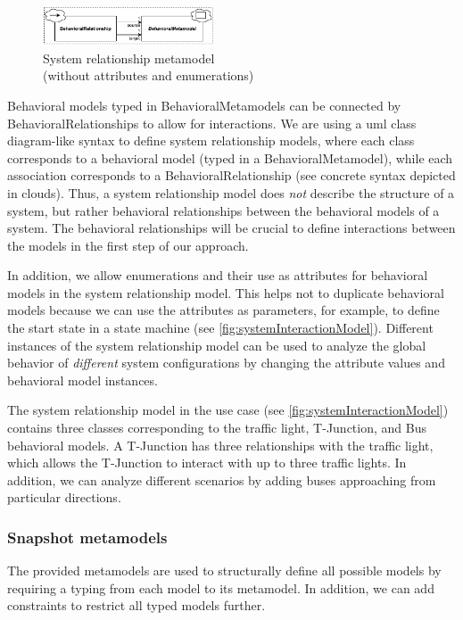 \documentclass{jot}
\begin{document}
\begin{figure}[h]
    \centering
    \includegraphics[width=0.45\textwidth]{figures/systemRelationshipMetamodel.pdf}
    \caption{System relationship metamodel \\ (without attributes and enumerations)}
    \label{fig:systemRelationshipMetamodel}
\end{figure}

Behavioral models typed in \textsf{BehavioralMetamodel}s can be connected by \textsf{BehavioralRelationship}s to allow for interactions.
We are using a \gls*{uml} class diagram-like syntax to define system relationship models, where each class corresponds to a behavioral model (typed in a \textsf{BehavioralMetamodel}), while each association corresponds to a \textsf{BehavioralRelationship} (see concrete syntax depicted in clouds).
Thus, a system relationship model does \emph{not} describe the structure of a system, but rather behavioral relationships between the behavioral models of a system.
The behavioral relationships will be crucial to define interactions between the models in the first step of our approach.

In addition, we allow enumerations and their use as attributes for behavioral models in the system relationship model.
This helps not to duplicate behavioral models because we can use the attributes as parameters, for example, to define the start state in a state machine (see \autoref{fig:systemInteractionModel}).
Different instances of the system relationship model can be used to analyze the global behavior of \emph{different} system configurations by changing the attribute values and behavioral model instances.

The system relationship model in the use case (see \autoref{fig:systemInteractionModel}) contains three classes corresponding to the traffic light, T-Junction, and Bus behavioral models.
A T-Junction has three relationships with the traffic light, which allows the T-Junction to interact with up to three traffic lights.
In addition, we can analyze different scenarios by adding buses approaching from particular directions.

\subsubsection{Snapshot metamodels}
The provided metamodels are used to structurally define all possible models by requiring a typing from each model to its metamodel.
In addition, we can add constraints to restrict all typed models further.
\end{document}
